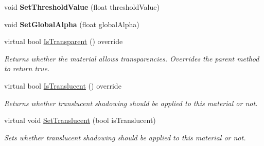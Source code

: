 \begin{DoxyCompactItemize}
void {\bfseries Set\+Threshold\+Value} (float threshold\+Value)
\item 
\mbox{\label{class_geometry_engine_1_1_geometry_material_1_1_transparent_material_a45cacc645954431aeccc862412de34f7}} 
void {\bfseries Set\+Global\+Alpha} (float global\+Alpha)
\item 
\mbox{\label{class_geometry_engine_1_1_geometry_material_1_1_transparent_material_a79bd48c5e5ab2e5f4768d5ee5d4e9aa6}} 
virtual bool \mbox{\hyperlink{class_geometry_engine_1_1_geometry_material_1_1_transparent_material_a79bd48c5e5ab2e5f4768d5ee5d4e9aa6}{Is\+Transparent}} () override
\begin{DoxyCompactList}\small\item\em Returns whether the material allows transparencies. Overrides the parent method to return true. \end{DoxyCompactList}\item 
\mbox{\label{class_geometry_engine_1_1_geometry_material_1_1_transparent_material_a8f1c79252a956b5ff856cb65dafdf86b}} 
virtual bool \mbox{\hyperlink{class_geometry_engine_1_1_geometry_material_1_1_transparent_material_a8f1c79252a956b5ff856cb65dafdf86b}{Is\+Translucent}} () override
\begin{DoxyCompactList}\small\item\em Returns whether translucent shadowing should be applied to this material or not. \end{DoxyCompactList}\item 
\mbox{\label{class_geometry_engine_1_1_geometry_material_1_1_transparent_material_aea8dc6fea6f642b67a7479ebb7921e23}} 
virtual void \mbox{\hyperlink{class_geometry_engine_1_1_geometry_material_1_1_transparent_material_aea8dc6fea6f642b67a7479ebb7921e23}{Set\+Translucent}} (bool is\+Translucent)
\begin{DoxyCompactList}\small\item\em Sets whether translucent shadowing should be applied to this material or not. \end{DoxyCompactList}\end{DoxyCompactItemize}
